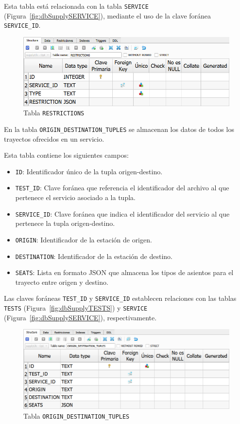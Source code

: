 Esta tabla está relacionada con la tabla \texttt{SERVICE} (Figura~\ref{fig:dbSupplySERVICE}), mediante el uso de la clave foránea \texttt{SERVICE\_ID}. 

\begin{figure}[H]
\centering
\includegraphics[width=.9\textwidth]{fig/Tablas base de datos/Oferta/RESTRICTIONS.png}
\caption{Tabla \texttt{RESTRICTIONS}}
\label{fig:dbSupplyRESTRICTIONS}
\end{figure}

En la tabla \texttt{ORIGIN\_DESTINATION\_TUPLES} se almacenan los datos de todos los trayectos ofrecidos en un servicio.  

Esta tabla contiene los siguientes campos:
\begin{itemize}
    \item \texttt{ID}: Identificador único de la tupla origen-destino.
    \item \texttt{TEST\_ID}: Clave foránea que referencia el identificador del archivo al que pertenece el servicio asociado a la tupla.
    \item \texttt{SERVICE\_ID}: Clave foránea que indica el identificador del servicio al que pertenece la tupla origen-destino.
    \item \texttt{ORIGIN}: Identificador de la estación de origen.
    \item \texttt{DESTINATION}: Identificador de la estación de destino.
    \item \texttt{SEATS}: Lista en formato \acrshort{JSON} que almacena los tipos de asientos para el trayecto entre origen y destino.
\end{itemize}

Las claves foráneas \texttt{TEST\_ID} y \texttt{SERVICE\_ID} establecen relaciones con las tablas \texttt{TESTS} (Figura~\ref{fig:dbSupplyTESTS}) y \texttt{SERVICE} (Figura~\ref{fig:dbSupplySERVICE}), respectivamente.

\begin{figure}[H]
\centering
\includegraphics[width=.9\textwidth]{fig/Tablas base de datos/Oferta/ORIGIN_DESTINATION_TUPLES.png}
\caption{Tabla \texttt{ORIGIN\_DESTINATION\_TUPLES}}
\label{fig:dbSupplyODT}
\end{figure}

